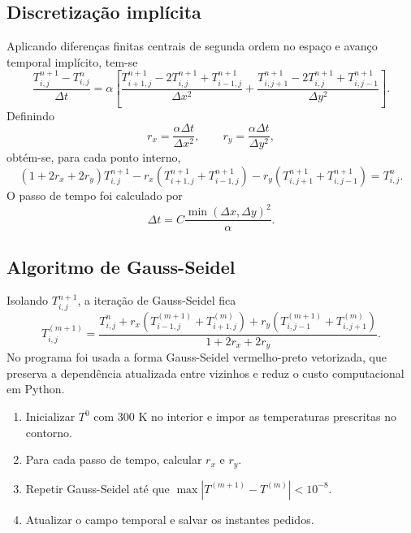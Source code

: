 \documentclass[12pt,a4paper]{article}
\begin{document}
\subsection{Discretização implícita}

Aplicando diferenças finitas centrais de segunda ordem no espaço e avanço temporal implícito, tem-se
\begin{equation}
    \frac{T_{i,j}^{n+1}-T_{i,j}^{n}}{\Delta t}
    =
    \alpha
    \left[
        \frac{T_{i+1,j}^{n+1}-2T_{i,j}^{n+1}+T_{i-1,j}^{n+1}}{\Delta x^2}
        +
        \frac{T_{i,j+1}^{n+1}-2T_{i,j}^{n+1}+T_{i,j-1}^{n+1}}{\Delta y^2}
    \right].
\end{equation}
Definindo
\[
    r_x=\frac{\alpha\Delta t}{\Delta x^2},
    \qquad
    r_y=\frac{\alpha\Delta t}{\Delta y^2},
\]
obtém-se, para cada ponto interno,
\begin{equation}
    (1+2r_x+2r_y)T_{i,j}^{n+1}
    -r_x(T_{i+1,j}^{n+1}+T_{i-1,j}^{n+1})
    -r_y(T_{i,j+1}^{n+1}+T_{i,j-1}^{n+1})
    =
    T_{i,j}^{n}.
\end{equation}
O passo de tempo foi calculado por
\begin{equation}
    \Delta t=C\frac{\min(\Delta x,\Delta y)^2}{\alpha}.
\end{equation}

\subsection{Algoritmo de Gauss-Seidel}

Isolando $T_{i,j}^{n+1}$, a iteração de Gauss-Seidel fica
\begin{equation}
    T_{i,j}^{(m+1)}
    =
    \frac{
        T_{i,j}^{n}
        +r_x\left(T_{i-1,j}^{(m+1)}+T_{i+1,j}^{(m)}\right)
        +r_y\left(T_{i,j-1}^{(m+1)}+T_{i,j+1}^{(m)}\right)
    }{1+2r_x+2r_y}.
\end{equation}
No programa foi usada a forma Gauss-Seidel vermelho-preto vetorizada, que preserva a dependência atualizada entre vizinhos e reduz o custo computacional em Python.

\begin{enumerate}
    \item Inicializar $T^0$ com 300 K no interior e impor as temperaturas prescritas no contorno.
    \item Para cada passo de tempo, calcular $r_x$ e $r_y$.
    \item Repetir Gauss-Seidel até que $\max|T^{(m+1)}-T^{(m)}|<10^{-8}$.
    \item Atualizar o campo temporal e salvar os instantes pedidos.
\end{enumerate}
\end{document}
